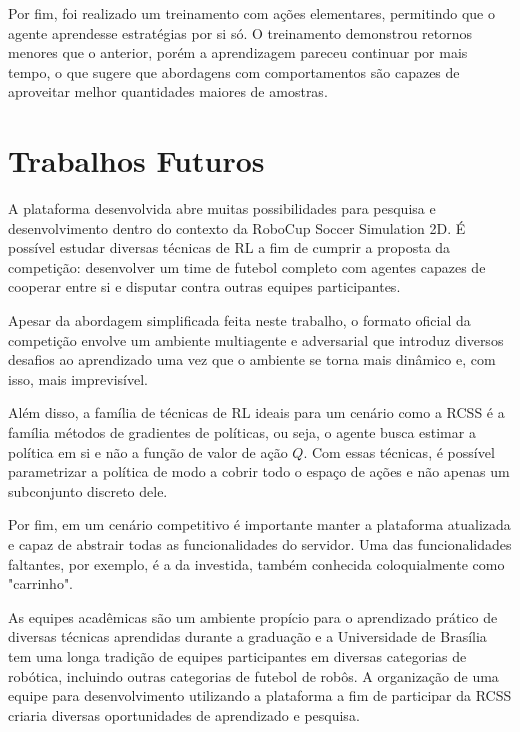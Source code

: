 Por fim, foi realizado um treinamento com ações elementares, permitindo que o agente aprendesse estratégias por si só. O treinamento demonstrou retornos menores que o anterior, porém a aprendizagem pareceu continuar por mais tempo, o que sugere que abordagens com comportamentos são capazes de aproveitar melhor quantidades maiores de amostras.

\section{Trabalhos Futuros}

A plataforma desenvolvida abre muitas possibilidades para pesquisa e desenvolvimento dentro do contexto da RoboCup Soccer Simulation 2D. É possível estudar diversas técnicas de RL a fim de cumprir a proposta da competição: desenvolver um time de futebol completo com agentes capazes de cooperar entre si e disputar contra outras equipes participantes.

Apesar da abordagem simplificada feita neste trabalho, o formato oficial da competição envolve um ambiente multiagente e adversarial que introduz diversos desafios ao aprendizado uma vez que o ambiente se torna mais dinâmico e, com isso, mais imprevisível.

Além disso, a família de técnicas de RL ideais para um cenário como a RCSS é a família métodos de gradientes de políticas, ou seja, o agente busca estimar a política em si e não a função de valor de ação $Q$. Com essas técnicas, é possível parametrizar a política de modo a cobrir todo o espaço de ações e não apenas um subconjunto discreto dele.

Por fim, em um cenário competitivo é importante manter a plataforma atualizada e capaz de abstrair todas as funcionalidades do servidor. Uma das funcionalidades faltantes, por exemplo, é a da investida, também conhecida coloquialmente como "carrinho".

As equipes acadêmicas são um ambiente propício para o aprendizado prático de diversas técnicas aprendidas durante a graduação e a Universidade de Brasília tem uma longa tradição de equipes participantes em diversas categorias de robótica, incluindo outras categorias de futebol de robôs. A organização de uma equipe para desenvolvimento utilizando a plataforma a fim de participar da RCSS criaria diversas oportunidades de aprendizado e pesquisa.

